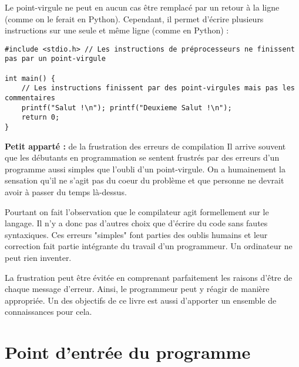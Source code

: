 \documentclass[../../../main.tex]{subfiles}
\begin{document}
Le point-virgule ne peut en aucun cas être remplacé par un retour à la ligne (comme on le ferait en Python). Cependant, il permet d'écrire plusieurs instructions sur une seule et même ligne (comme en Python) :
\begin{verbatim}
#include <stdio.h> // Les instructions de préprocesseurs ne finissent pas par un point-virgule

int main() {
	// Les instructions finissent par des point-virgules mais pas les commentaires
	printf("Salut !\n"); printf("Deuxieme Salut !\n"); 
	return 0;
}
\end{verbatim}

\begin{minitelbasicbox}{\textbf{Petit apparté :} de la frustration des erreurs de compilation}
Il arrive souvent que les débutants en programmation se sentent frustrés par des erreurs d'un programme aussi simples que l'oubli d'un point-virgule. On a humainement la sensation qu'il ne s'agit pas du coeur du problème et que personne ne devrait avoir à passer du temps là-dessus.

Pourtant on fait l'observation que le compilateur agit formellement sur le langage. Il n'y a donc pas d'autres choix que d'écrire du code sans fautes syntaxiques. Ces erreurs "simples" font parties des oublis humains et leur correction fait partie intégrante du travail d'un programmeur. Un ordinateur ne peut rien inventer.

La frustration peut être évitée en comprenant parfaitement les raisons d'être de chaque message d'erreur. Ainsi, le programmeur peut y réagir de manière appropriée. Un des objectifs de ce livre est aussi d'apporter un ensemble de connaissances pour cela.
\end{minitelbasicbox}
\newpage
\section{Point d'entrée du programme}\label{sec:point_d_entr_e_du_programme}

\end{document}
